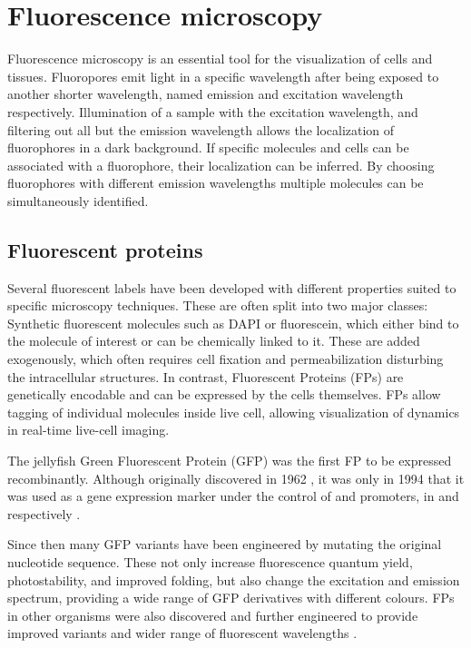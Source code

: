 \section{Fluorescence microscopy}

  Fluorescence microscopy is an essential tool
  for the visualization of cells and tissues.
  Fluoropores emit light in a specific wavelength after
  being exposed to another shorter wavelength, named
  emission and excitation wavelength respectively.
  Illumination of a sample with the excitation wavelength, and filtering
  out all but the emission wavelength allows
  the localization of fluorophores in a dark background.
  If specific molecules and cells can be associated with a fluorophore,
  their localization can be inferred.  By choosing fluorophores
  with different emission wavelengths multiple molecules can be
  simultaneously identified.

  \subsection{Fluorescent proteins}
    Several fluorescent labels have been developed with different
    properties suited to specific microscopy techniques.
    These are often split into two major classes:
    Synthetic fluorescent
    molecules such as DAPI or fluorescein, which either bind to the molecule of
    interest or can be chemically linked to it.
    These are added exogenously, which often requires cell
    fixation and permeabilization disturbing the intracellular structures.
    In contrast, Fluorescent Proteins (FPs)
    are genetically encodable and can be expressed by the cells themselves.
    FPs allow tagging of individual molecules inside live cell, allowing
    visualization of dynamics in real-time live-cell imaging.

    The  jellyfish
    Green Fluorescent Protein (GFP) was
    the first FP to be expressed recombinantly.
    Although originally discovered in 1962 \citep{shimomura1962-gfp-discovery},
    it was only in 1994 that it was used as a gene expression
    marker under the control of  and
     promoters, in  and 
    respectively \citep{gfp-first-expression-marker}.

    Since then many GFP variants have been engineered by mutating the
    original nucleotide sequence.  These not only increase fluorescence
    quantum yield, photostability, and improved folding, but also change
    the excitation and emission spectrum, providing a wide range of GFP
    derivatives with different colours.  FPs in other organisms were also
    discovered and further engineered to provide improved
    variants and wider range of fluorescent wavelengths
    \citep{FP-color-palette}.

